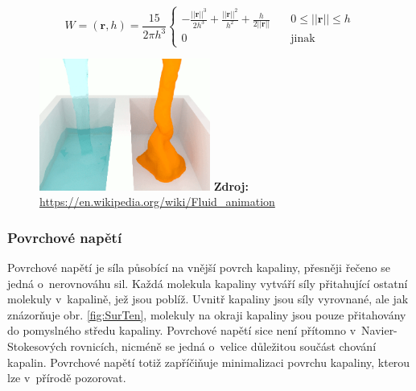 \begin{equation}
	W = (\mathbf{r}, h) = \frac{15}{2 \pi h^3}
	\begin{cases}
		-\frac{||\mathbf{r}||^3}{2h^3} + \frac{||\mathbf{r}||^2}{h^2} + \frac{h}{2||\mathbf{r}||} & \quad 0 \leq ||\mathbf{r}|| \leq h \\
		0                                                                                         & \quad \text{jinak}
	\end{cases}
	\label{eq:viscKernel}
\end{equation}

\begin{figure}[hbt]
	\centering
	\captionsetup{justification=centering}
	\includegraphics[width=0.5\textwidth]{obrazky-figures/viskozita.PNG}
	\textbf{Zdroj: } \url{https://en.wikipedia.org/wiki/Fluid_animation}
	\label{fig:Vics}
\end{figure}

\subsubsection{Povrchové napětí}
Povrchové napětí je síla působící na vnější povrch kapaliny, přesněji řečeno se jedná o~nerovnováhu sil. Každá molekula kapaliny vytváří síly přitahující ostatní molekuly v~kapalině, jež jsou poblíž. Uvnitř kapaliny jsou síly vyrovnané, ale jak znázorňuje obr. \ref{fig:SurTen}, molekuly na okraji kapaliny jsou pouze přitahovány do pomyslného středu kapaliny. Povrchové napětí sice není přítomno v~Navier-Stokesových rovnicích, nicméně se jedná o~velice důležitou součást chování kapalin. Povrchové napětí totiž zapříčiňuje minimalizaci povrchu kapaliny, kterou lze v~přírodě pozorovat. \cite{KelagerSPH}

